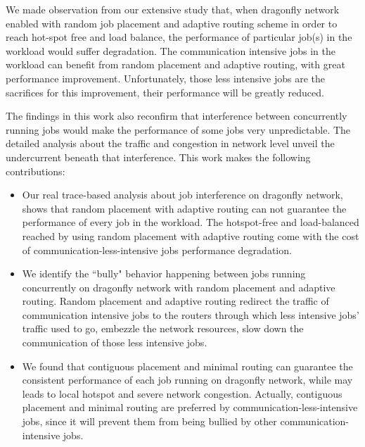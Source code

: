 \documentclass[conference,compsoc]{IEEEtran}
\begin{document}


We made observation from our extensive study that, when dragonfly network enabled with random job placement and adaptive routing scheme in order to reach hot-spot free and load balance, the performance of particular job(s) in the workload would suffer degradation. The communication intensive jobs in the workload can benefit from random placement and adaptive routing, with great performance improvement. Unfortunately, those less intensive jobs are the sacrifices for this improvement, their performance will be greatly reduced. 

The findings in this work also reconfirm that interference between concurrently running jobs would make the performance of some jobs very unpredictable. The detailed analysis about the traffic and congestion in network level unveil the undercurrent beneath that interference. This work makes the following contributions:

\begin{itemize}
   
    \item Our real trace-based analysis about job interference on dragonfly network, shows that random placement with adaptive routing can not guarantee the performance of every job in the workload. The hotspot-free and load-balanced reached by using random placement with adaptive routing come with the cost of communication-less-intensive jobs performance degradation. 

    \item We identify the ``bully" behavior happening between jobs running concurrently on dragonfly network with random placement and adaptive routing. Random placement and adaptive routing redirect the traffic of communication intensive jobs to the routers through which less intensive jobs' traffic used to go, embezzle the network resources, slow down the communication of those less intensive jobs.

    
    \item We found that contiguous placement and minimal routing can guarantee the consistent performance of each job running on dragonfly network, while may leads to local hotspot and severe network congestion. Actually, contiguous placement and minimal routing are preferred by communication-less-intensive jobs, since it will prevent them from being bullied by other communication-intensive jobs.
    
         
\end{itemize}
\end{document}
